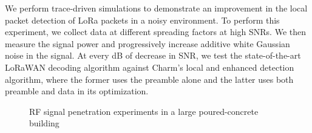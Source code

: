 We perform trace-driven simulations to demonstrate an improvement in the local packet detection
of LoRa packets in a noisy environment. To perform this experiment, we collect
data at different spreading factors at high SNRs. We then measure the signal
power and progressively increase additive white Gaussian noise in the signal.
At every dB of decrease in SNR, we test the state-of-the-art LoRaWAN decoding
algorithm against Charm's local and enhanced detection algorithm, where the
former uses the preamble alone and the latter uses both preamble and data in
its optimization.

\begin{figure}[!t]
\centering
\vspace{-20pt}
\hfill
{}
\vspace{-10pt}
\caption{RF signal penetration experiments in a large poured-concrete building}
\label{fig:penetration-test}
\vspace{-16pt}
\end{figure}

